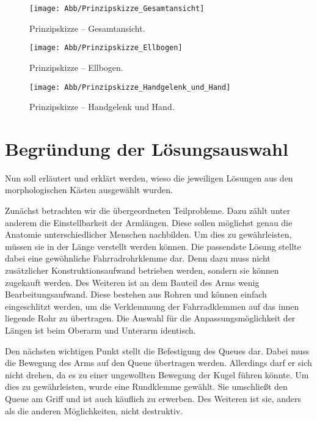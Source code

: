 			\begin{figure}[h]
				\centering
				\texttt{[image: Abb/Prinzipskizze\_Gesamtansicht]}
				\caption[Prinzipskizze -- Gesamtansicht]{Prinzipskizze -- Gesamtansicht.}\label{fig:prinzipskizze-gesamtansicht}
			\end{figure}

			\begin{figure}[h]
				\centering
				\texttt{[image: Abb/Prinzipskizze\_Ellbogen]}
				\caption[Prinzipskizze -- Ellbogen]{Prinzipskizze -- Ellbogen.}\label{fig:prinzipskizze-ellbogen}
			\end{figure}

			\begin{figure}[h]
				\centering
				\texttt{[image: Abb/Prinzipskizze\_Handgelenk\_und\_Hand]}
				\caption[Prinzipskizze -- Handgelenk und Hand]{Prinzipskizze -- Handgelenk und Hand.}\label{fig:prinzipskizze-handgelenk-und-hand}
			\end{figure}

	\section{Begründung der Lösungsauswahl}\label{Begruendung Loesungsauswahl}

		Nun soll erläutert und erklärt werden, wieso die jeweiligen Lösungen aus den morphologischen Kästen ausgewählt wurden.\par\medskip

		Zunächst betrachten wir die übergeordneten Teilprobleme. Dazu zählt unter anderem die Einstellbarkeit der Armlängen. Diese sollen möglichst genau die Anatomie unterschiedlicher Menschen nachbilden. Um dies zu gewährleisten, müssen sie in der Länge verstellt werden können. Die passendste Lösung stellte dabei eine gewöhnliche Fahrradrohrklemme dar. Denn dazu muss nicht zusätzlicher Konstruktionsaufwand betrieben werden, sondern sie können zugekauft werden. Des Weiteren ist an dem Bauteil des Arms wenig Bearbeitungsaufwand. Diese bestehen aus Rohren und können einfach eingeschlitzt werden, um die Verklemmung der Fahrradklemmen auf das innen liegende Rohr zu übertragen. Die Auswahl für die Anpassungsmöglichkeit der Längen ist beim Oberarm und Unterarm identisch.\par\medskip

		Den nächsten wichtigen Punkt stellt die Befestigung des Queues dar. Dabei muss die Bewegung des Arms auf den Queue übertragen werden. Allerdings darf er sich nicht drehen, da es zu einer ungewollten Bewegung der Kugel führen könnte. Um dies zu gewährleisten, wurde eine Rundklemme gewählt. Sie umschließt den Queue am Griff und ist auch käuflich zu erwerben. Des Weiteren ist sie, anders als die anderen Möglichkeiten, nicht destruktiv.\par\medskip
		
